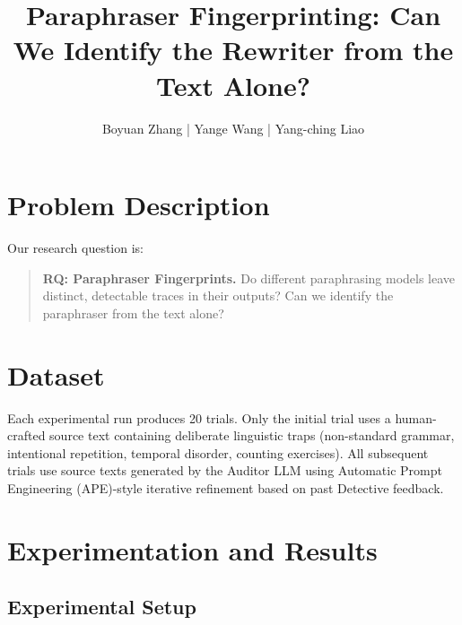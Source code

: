 \documentclass[sigconf,nonacm]{acmart}
\begin{document}
\title{Paraphraser Fingerprinting: Can We Identify the Rewriter from the Text Alone?}

\author{Boyuan Zhang | Yange Wang | Yang-ching Liao}


\maketitle

\section{Problem Description}


Our research question is:
\begin{quote}
\textbf{RQ: Paraphraser Fingerprints.} Do different paraphrasing models leave distinct, detectable traces in their outputs? Can we identify the paraphraser from the text alone?
\end{quote}

\section{Dataset}

Each experimental run produces 20 trials.
Only the initial trial uses a human-crafted source text containing deliberate linguistic traps (non-standard grammar, intentional repetition, temporal disorder, counting exercises).
All subsequent trials use source texts generated by the Auditor LLM using Automatic Prompt Engineering (APE)-style iterative refinement based on past Detective feedback.

\section{Experimentation and Results}

\subsection{Experimental Setup}
\end{document}
